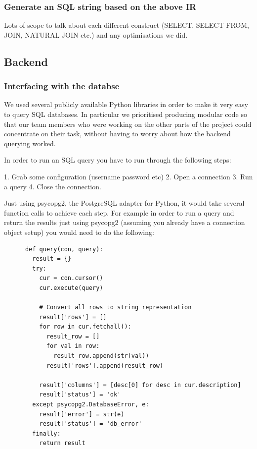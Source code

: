 \documentclass[a4paper, 11pt]{article}
\begin{document}
    \subsubsection{Generate an SQL string based on the above IR}
      Lots of scope to talk about each different construct (SELECT, SELECT FROM, JOIN, NATURAL JOIN etc.) and any optimisations we did.

    \subsection{Backend}
     \subsubsection{Interfacing with the databse}

      We used several publicly available Python libraries in order to make 
      it very easy to query SQL databases. In particular we prioritised
      producing modular code so that our team members who were working on the
      other parts of the project could concentrate on their task, without having
      to worry about how the backend querying worked.

      In order to run an SQL query you have to run through the following steps:

      1. Grab some configuration (username password etc)
      2. Open a connection
      3. Run a query
      4. Close the connection.

      Just using psycopg2, the PostgreSQL adapter for Python, it would take
      several function calls to achieve each step. For example in order to run a
      query and return the results just using psycopg2 (assuming you already
      have a connection object setup) you would need to do the following:
      
     
      \begin{verbatim}
      def query(con, query):
        result = {}
        try:
          cur = con.cursor()
          cur.execute(query)

          # Convert all rows to string representation
          result['rows'] = []
          for row in cur.fetchall():
            result_row = []
            for val in row:
              result_row.append(str(val))
            result['rows'].append(result_row)

          result['columns'] = [desc[0] for desc in cur.description]
          result['status'] = 'ok'
        except psycopg2.DatabaseError, e:
          result['error'] = str(e)
          result['status'] = 'db_error'
        finally:
          return result
      \end{verbatim}
\end{document}
